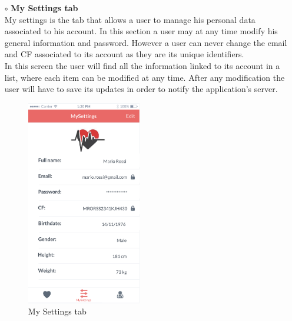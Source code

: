 \documentclass[titlepage]{article}
\begin{document}
\begin{itemize}
\begin{itemize}
\begin{itemize}
					\item[$\circ$] {\bf My Settings tab}  \\
				My settings is the tab that allows a user to manage his personal data associated to his account. In this section a user may at any time modify his general information and password. However a user can never change the email and CF associated to its account as they are its unique identifiers.\\
In this screen the user will find all the information linked to its account in a list, where each item can be modified at any time. After any modification the user will have to save its updates in order to notify the application’s server.\\
					\begin{figure}[H]
						\center
  						\includegraphics[width=5cm]{Mockup/mockupSettingsSU.png}
  						\caption{My Settings tab}
 					 	\label{fig:MyS}
					\end{figure}


\end{itemize}
\end{itemize}
\end{itemize}
\end{document}
